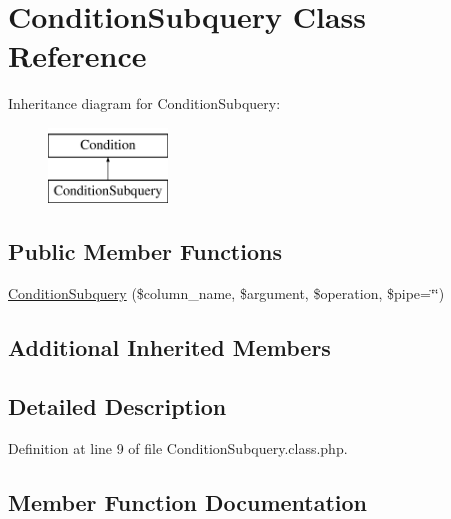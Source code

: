 \hypertarget{classConditionSubquery}{}\section{Condition\+Subquery Class Reference}
\label{classConditionSubquery}
Inheritance diagram for Condition\+Subquery\+:\begin{figure}[H]
\begin{center}
\leavevmode
\includegraphics[height=2.000000cm]{classConditionSubquery}
\end{center}
\end{figure}
\subsection*{Public Member Functions}
\begin{DoxyCompactItemize}
\item 
\hyperlink{classConditionSubquery_a5dd42cd7316837c2b63fe9b6d5703958}{Condition\+Subquery} (\$column\+\_\+name, \$argument, \$operation, \$pipe=\char`\"{}\char`\"{})
\end{DoxyCompactItemize}
\subsection*{Additional Inherited Members}


\subsection{Detailed Description}


Definition at line 9 of file Condition\+Subquery.\+class.\+php.



\subsection{Member Function Documentation}
\mbox{\label{classConditionSubquery_a5dd42cd7316837c2b63fe9b6d5703958}} 
